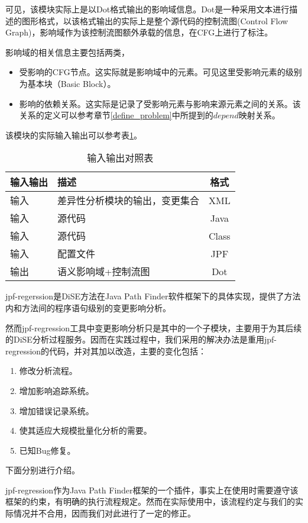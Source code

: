 可见，该模块实际上是以Dot格式输出的影响域信息。Dot是一种采用文本进行描述的图形格式，以该格式输出的实际上是整个源代码的控制流图(Control Flow Graph)，影响域作为该控制流图额外承载的信息，在CFG上进行了标注。

影响域的相关信息主要包括两类，
\begin{itemize}
	\item 受影响的CFG节点。这实际就是影响域中的元素。可见这里受影响元素的级别为基本块（Basic Block）。
	\item 影响的依赖关系。这实际是记录了受影响元素与影响来源元素之间的关系。该关系的定义可以参考章节\ref {define_problem}中所提到的$depend$映射关系。
\end{itemize}

该模块的实际输入输出可以参考表\ref {impact_io2}。

\begin{table}[H]
	\caption{输入输出对照表}
	\label{impact_io2}
	\centering
	\begin{tabular}{llc}
		\toprule[1.5pt]
		{\heiti 输入输出} & {\heiti 描述} & {\heiti 格式} \\\midrule[1pt]
		输入 & 差异性分析模块的输出，变更集合 & XML \\
		输入 & 源代码 & Java \\
		输入 & 源代码 & Class \\
		输入 & 配置文件 & JPF \\
		输出 & 语义影响域+控制流图 & Dot \\
		\bottomrule[1.5pt]
	\end{tabular}
\end{table}

jpf-regerssion是DiSE方法在Java Path Finder软件框架下的具体实现，提供了方法内和方法间的程序语句级别的变更影响分析。

然而jpf-regression工具中变更影响分析只是其中的一个子模块，主要用于为其后续的DiSE分析过程服务。因而在实践过程中，我们采用的解决办法是重用jpf-regression的代码，并对其加以改造，主要的变化包括：
\begin{enumerate}
	\item 修改分析流程。
	\item 增加影响追踪系统。
	\item 增加错误记录系统。
	\item 使其适应大规模批量化分析的需要。
	\item 已知Bug修复。
\end{enumerate}

下面分别进行介绍。


jpf-regression作为Java Path Finder框架的一个插件，事实上在使用时需要遵守该框架的约束，有明确的执行流程规定。然而在实际使用中，该流程约定与我们的实际情况并不合用，因而我们对此进行了一定的修正。

